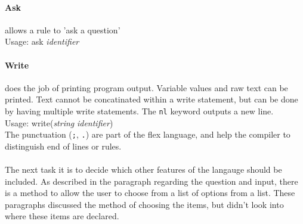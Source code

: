 \documentclass[12pt]{report}
\begin{document}
\paragraph{Ask} allows a rule to 'ask a question'\\
Usage: ask \textit{identifier}\\
\paragraph{Write} does the job of printing program output.  Variable values and raw text can be printed.  Text cannot be concatinated within a write statement, but can be done by having multiple write statements.  The \texttt{nl} keyword outputs a new line.\\
Usage: write(\textit{string} \textbar \space \textit{identifier})\\
The punctuation (\texttt{;}, \texttt{.}) are part of the flex language, and help the compiler to distinguish end of lines or rules.\\
\\
The next task it is to decide which other features of the langauge should be included.  As described in the paragraph regarding the question and input, there is a method to allow the user to choose from a list of options from a list.  These paragraphs discussed the method of choosing the items, but didn't look into where these items are declared.
\end{document}
